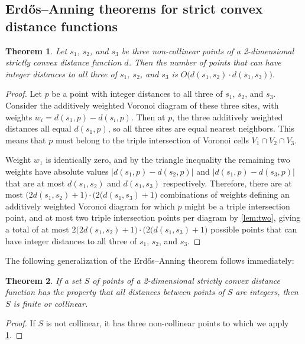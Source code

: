 \documentclass[11pt]{article}
\newtheorem{theorem}{Theorem}
\theoremstyle{definition}
\begin{document}
\subsection{Erd\H{o}s--Anning theorems for strict convex distance functions}

\begin{theorem}
\label{thm:triangle}
Let $s_1$, $s_2$, and $s_3$ be three non-collinear points of a 2-dimensional strictly convex distance function $d$. Then the number of points that can have integer distances to all three of $s_1$, $s_2$, and $s_3$ is $O\bigl(d(s_1,s_2)\cdot d(s_1,s_3)\bigr)$.
\end{theorem}

\begin{proof}
Let $p$ be a point with integer distances to all three of $s_1$, $s_2$, and $s_3$. Consider the additively weighted Voronoi diagram of these three sites, with weights $w_i=d(s_1,p)-d(s_i,p)$. Then at $p$, the three additively weighted distances all equal $d(s_1,p)$, so all three sites are equal nearest neighbors. This means that $p$ must belong to the triple intersection of Voronoi cells $V_1\cap V_2\cap V_3$.

Weight $w_1$ is identically zero, and by the triangle inequality the remaining two weights have absolute values $|d(s_1,p)-d(s_2,p)|$ and $|d(s_1,p)-d(s_3,p)|$ that are at most $d(s_1,s_2)$ and $d(s_1,s_3)$ respectively. Therefore, there are at most $\bigl(2d(s_1,s_2)+1\bigr)\cdot \bigl(2(d(s_1,s_3)+1\bigr)$ combinations of weights defining an additively weighted Voronoi diagram for which $p$ might be a triple intersection point, and at most two triple intersection points per diagram by \cref{lem:two}, giving a total of at most $2\bigl(2d(s_1,s_2)+1\bigr)\cdot \bigl(2(d(s_1,s_3)+1\bigr)$ possible points that can have integer distances to all three of $s_1$, $s_2$, and $s_3$.
\end{proof}

The following generalization of the Erd\H{o}s--Anning theorem follows immediately:

\begin{theorem}
\label{thm:finite}
If a set $S$ of points of a 2-dimensional strictly convex distance function has the property that all distances between points of $S$ are integers, then $S$ is finite or collinear.
\end{theorem}

\begin{proof}
If $S$ is not collinear, it has three non-collinear points to which we apply \cref{thm:triangle}.
\end{proof}
\end{document}

